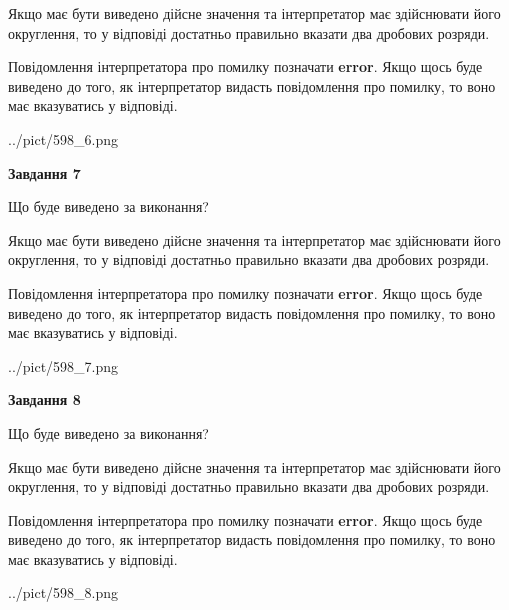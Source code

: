 \documentclass[12pt, ukrainian]{article}
\begin{document}
{\begin {Large}
Якщо має бути виведено дійсне значення та інтерпретатор має здійснювати його округлення, 
то у відповіді достатньо правильно вказати два дробових розряди.

Повідомлення інтерпретатора про помилку позначати \textbf{error}.
Якщо щось буде виведено до того, як інтерпретатор видасть повідомлення про помилку, 
то воно має вказуватись у відповіді. \par

\begin{center}
	{../pict/598_6.png}
\end{center}
\newpage

{\begin {center}\textbf{Завдання 7}\end {center}}\par
Що буде виведено за виконання? \par

Якщо має бути виведено дійсне значення та інтерпретатор має здійснювати його округлення, 
то у відповіді достатньо правильно вказати два дробових розряди.

Повідомлення інтерпретатора про помилку позначати \textbf{error}.
Якщо щось буде виведено до того, як інтерпретатор видасть повідомлення про помилку, 
то воно має вказуватись у відповіді. \par

\begin{center}
	{../pict/598_7.png}
\end{center}
\newpage

{\begin {center}\textbf{Завдання 8}\end {center}}\par
Що буде виведено за виконання? \par

Якщо має бути виведено дійсне значення та інтерпретатор має здійснювати його округлення, 
то у відповіді достатньо правильно вказати два дробових розряди.

Повідомлення інтерпретатора про помилку позначати \textbf{error}.
Якщо щось буде виведено до того, як інтерпретатор видасть повідомлення про помилку, 
то воно має вказуватись у відповіді. \par

\begin{center}
	{../pict/598_8.png}
\end{center}
\newpage


\end{Large}}
\end{document}
